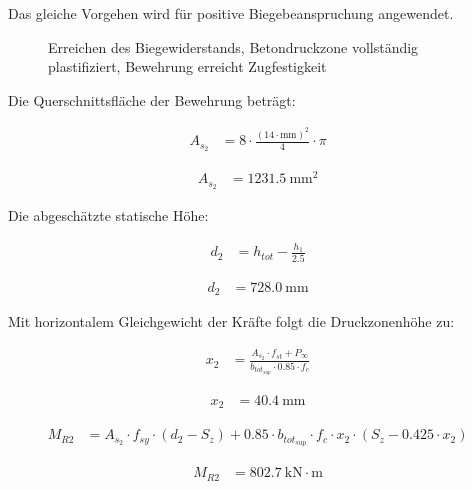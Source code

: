 \documentclass[
  11pt,
  letterpaper,
]{scrreprt}
\begin{document}
Das gleiche Vorgehen wird für positive Biegebeanspruchung angewendet.

\begin{figure}[H]


\caption{\label{fig-t6_qs_MR_pos}Erreichen des Biegewiderstands,
Betondruckzone vollständig plastifiziert, Bewehrung erreicht
Zugfestigkeit}

\end{figure}%

Die Querschnittsfläche der Bewehrung beträgt:

$$
\begin{aligned}
A_{s_{2}} &= 8 \cdot \frac{ \left( 14 \cdot \mathrm{mm} \right) ^{ 2 } }{ 4 } \cdot \pi \; 
\end{aligned}
$$

$$
\begin{aligned}
A_{s_{2}} &= 1231.5\ \mathrm{mm}^{2} \;
\end{aligned}
$$

Die abgeschätzte statische Höhe:

$$
\begin{aligned}
d_{2} &= h_{tot} - \frac{ h_{1} }{ 2.5 } \; 
\end{aligned}
$$

$$
\begin{aligned}
d_{2} &= 728.0\ \mathrm{mm} \;
\end{aligned}
$$

Mit horizontalem Gleichgewicht der Kräfte folgt die Druckzonenhöhe zu:

$$
\begin{aligned}
x_{2} &= \frac{ A_{s_{2}} \cdot f_{st} + P_{\infty} }{ b_{tot_{sup}} \cdot 0.85 \cdot f_{c} } \; 
\end{aligned}
$$

$$
\begin{aligned}
x_{2} &= 40.4\ \mathrm{mm} \;
\end{aligned}
$$

$$
\begin{aligned}
M_{R2} &= A_{s_{2}} \cdot f_{sy} \cdot \left( d_{2} - S_{z} \right) + 0.85 \cdot b_{tot_{sup}} \cdot f_{c} \cdot x_{2} \cdot \left( S_{z} - 0.425 \cdot x_{2} \right) \; 
\end{aligned}
$$

$$
\begin{aligned}
M_{R2} &= 802.7\ \mathrm{kN} \cdot \mathrm{m} \;
\end{aligned}
$$
\end{document}
